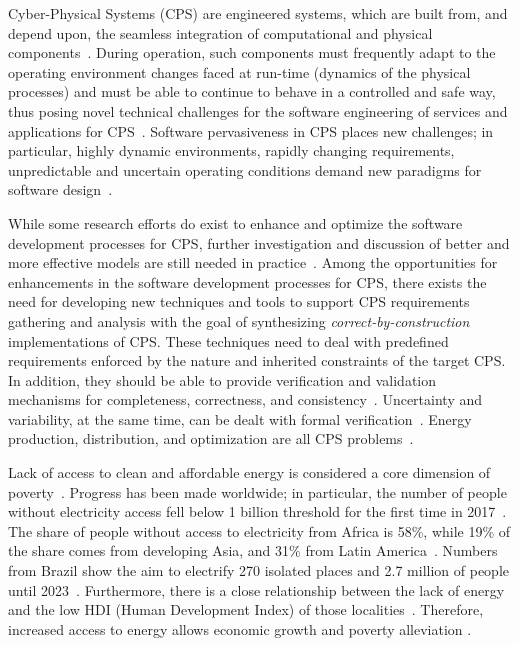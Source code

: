 Cyber-Physical Systems (CPS) are engineered systems, which are built from, and depend upon, the seamless integration of computational and physical  components~\cite{NSF2015}. During operation, such components must frequently adapt to the operating environment changes faced at run-time (dynamics of the physical processes) and must be able to continue to behave in a controlled and safe way, thus posing novel technical challenges for the software engineering of services and applications for CPS~\cite{Metzger2014}. Software pervasiveness in CPS places new challenges; in particular, highly dynamic environments, rapidly changing requirements, unpredictable and uncertain operating conditions demand new paradigms for software design~\cite{Filieri2015}.

While some research efforts do exist to enhance and optimize the software development processes for CPS, further investigation and discussion of better and more effective models are still needed in practice~\cite{Al-Jaroodi2016}. Among the opportunities for enhancements in the software development processes for CPS, there exists the need for developing new techniques and tools to support CPS requirements gathering and analysis with the goal of synthesizing \textit{correct-by-construction} implementations of CPS. These techniques need to deal with predefined requirements enforced by the nature and inherited constraints of the target CPS. In addition, they should be able to provide verification and validation mechanisms for completeness, correctness, and consistency~\cite{Al-Jaroodi2016}. Uncertainty and variability, at the same time, can be dealt with formal verification~\cite{NESSI}. Energy production, distribution, and optimization are all CPS problems~\cite{UC}. 

Lack of access to clean and affordable energy is considered a core dimension of poverty~\cite{Hussein2012}. Progress has been made worldwide; in particular, the number of people without electricity access fell below 1 billion threshold for the first time in 2017~\cite{IEAweo2018}. The share of people without access to electricity from Africa is 58\%, while 19\% of the share comes from developing Asia, and 31\% from Latin America~\cite{IEAweo2018}. Numbers from Brazil show the aim to electrify 270 isolated places and 2.7 million of people until 2023~\cite{EPE2018}. 
Furthermore, there is a close relationship between the lack of energy and the low HDI (Human Development Index) of those localities~\cite{Coelho}. Therefore, increased access to energy allows economic growth and poverty alleviation \cite{Karekesi}.

